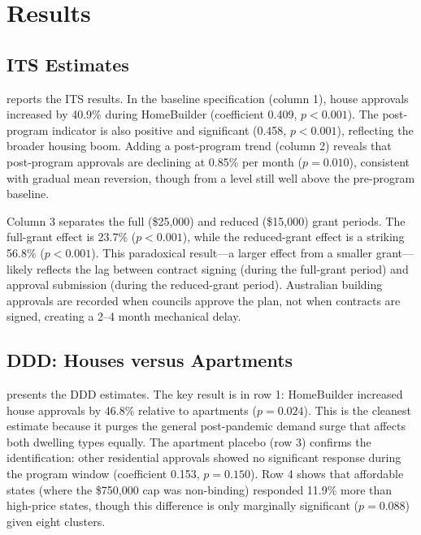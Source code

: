 \documentclass[12pt]{article}
\begin{document}
\section{Results}
\label{sec:results}

\subsection{ITS Estimates}

 reports the ITS results. In the baseline specification (column 1), house approvals increased by 40.9\% during HomeBuilder (coefficient 0.409, $p < 0.001$). The post-program indicator is also positive and significant (0.458, $p < 0.001$), reflecting the broader housing boom. Adding a post-program trend (column 2) reveals that post-program approvals are declining at 0.85\% per month ($p = 0.010$), consistent with gradual mean reversion, though from a level still well above the pre-program baseline.

Column 3 separates the full (\$25,000) and reduced (\$15,000) grant periods. The full-grant effect is 23.7\% ($p < 0.001$), while the reduced-grant effect is a striking 56.8\% ($p < 0.001$). This paradoxical result---a larger effect from a smaller grant---likely reflects the lag between contract signing (during the full-grant period) and approval submission (during the reduced-grant period). Australian building approvals are recorded when councils approve the plan, not when contracts are signed, creating a 2--4 month mechanical delay.



\subsection{DDD: Houses versus Apartments}

 presents the DDD estimates. The key result is in row 1: HomeBuilder increased house approvals by 46.8\% relative to apartments ($p = 0.024$). This is the cleanest estimate because it purges the general post-pandemic demand surge that affects both dwelling types equally. The apartment placebo (row 3) confirms the identification: other residential approvals showed no significant response during the program window (coefficient 0.153, $p = 0.150$). Row 4 shows that affordable states (where the \$750,000 cap was non-binding) responded 11.9\% more than high-price states, though this difference is only marginally significant ($p = 0.088$) given eight clusters.
\end{document}
